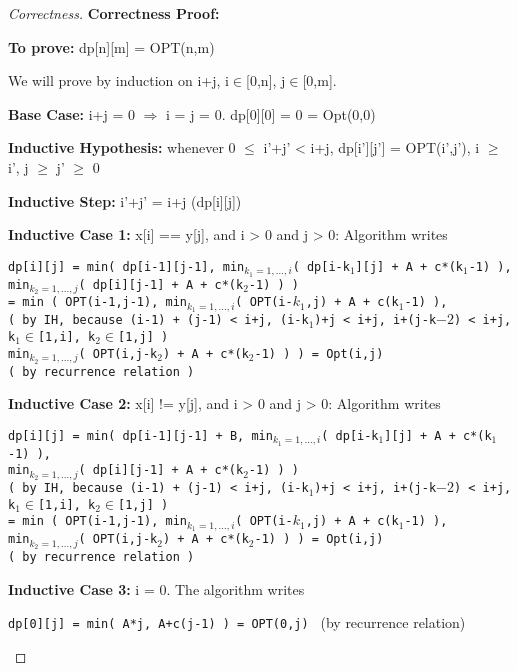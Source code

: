 \documentclass[openany]{article}
\begin{document}
\begin{proof}[Correctness]{}
    \textbf{Correctness Proof:}
    
    \textbf{To prove:} dp[n][m] = OPT(n,m)
    
    We will prove by induction on i+j, i$\in$[0,n], j$\in$[0,m].
    
    \textbf{Base Case:} i+j = 0 $\Rightarrow$ i = j = 0. dp[0][0] = 0 = Opt(0,0)
    
    \textbf{Inductive Hypothesis:} whenever 0 $\leq$ i'+j' < i+j, dp[i'][j'] = OPT(i',j'), i $\geq$ i', j $\geq$ j' $\geq$ 0
    
    \textbf{Inductive Step:} i'+j' = i+j (dp[i][j])
    
    \textbf{Inductive Case 1:}  x[i] == y[j], and i > 0 and j > 0:
    Algorithm writes 
    \begin{center}
        \texttt{dp[i][j] = min( dp[i-1][j-1], min$_{k_1=1,...,i}$( dp[i-k$_1$][j] + A + c*(k$_1$-1) ),\\min$_{k_2=1,...,j}$( dp[i][j-1] + A + c*(k$_2$-1) ) )\\
        = min ( OPT(i-1,j-1), min$_{k_1=1,...,i}$( OPT(i-$k_1$,j) + A + c(k$_1$-1) ), \\( by IH, because (i-1) + (j-1) < i+j, (i-k$_1$)+j < i+j, i+(j-k$-2$) < i+j, k$_1$$\in$[1,i], k$_2$$\in$[1,j] ) \\min$_{k_2=1,...,j}$( OPT(i,j-k$_2$) + A + c*(k$_2$-1) ) ) = Opt(i,j) \\( by recurrence relation )}
    \end{center}

    \textbf{Inductive Case 2:}  x[i] != y[j], and i > 0 and j > 0:
    Algorithm writes 
    \begin{center}
        \texttt{dp[i][j] = min( dp[i-1][j-1] + B, min$_{k_1=1,...,i}$( dp[i-k$_1$][j] + A + c*(k$_1$-1) ),\\min$_{k_2=1,...,j}$( dp[i][j-1] + A + c*(k$_2$-1) ) ) \\( by IH, because (i-1) + (j-1) < i+j, (i-k$_1$)+j < i+j, i+(j-k$-2$) < i+j, k$_1$$\in$[1,i], k$_2$$\in$[1,j] )\\
= min ( OPT(i-1,j-1), min$_{k_1=1,...,i}$( OPT(i-$k_1$,j) + A + c(k$_1$-1) ), \\min$_{k_2=1,...,j}$( OPT(i,j-k$_2$) + A + c*(k$_2$-1) ) ) = Opt(i,j) \\( by recurrence relation ) }
    \end{center}

    \textbf{Inductive Case 3:} i = 0. The algorithm writes 
    \begin{center}
        \texttt{dp[0][j] = min( A*j, A+c(j-1) ) = OPT(0,j) } (by recurrence relation)
    \end{center}
    

\end{proof}
\end{document}
